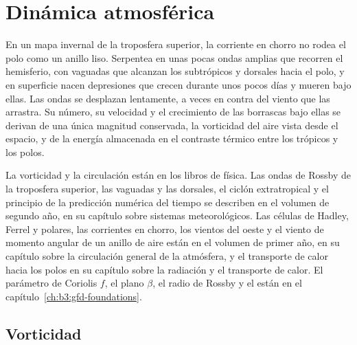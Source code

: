 \chapter{Dinámica atmosférica}\label{ch:b3:atmospheric-dynamics}

En un mapa invernal de la troposfera superior, la corriente en chorro no rodea
el polo como un anillo liso. Serpentea en unas pocas ondas amplias que recorren
el hemisferio, con vaguadas que alcanzan los subtrópicos y dorsales hacia el
polo, y en superficie nacen depresiones que crecen durante unos pocos días y
mueren bajo ellas. Las ondas se desplazan lentamente, a veces en contra del viento que las
arrastra. Su número, su velocidad y el crecimiento de las borrascas bajo ellas
se derivan de una única magnitud conservada, la vorticidad del aire vista desde
el espacio, y de la energía almacenada en el contraste térmico entre los
trópicos y los polos.

\begin{recall}
La vorticidad y la circulación están en los libros de física. Las ondas de Rossby de la
troposfera superior, las vaguadas y las dorsales, el ciclón extratropical y el
principio de la predicción numérica del tiempo se describen en el volumen de segundo
año, en su capítulo sobre sistemas meteorológicos. Las células de Hadley, Ferrel y
polares, las corrientes en chorro, los vientos del oeste y el viento de momento angular de un anillo de
aire están en el volumen de primer año, en su capítulo sobre la circulación general de
la atmósfera, y el transporte de calor hacia los polos en su capítulo sobre
la radiación y el transporte de calor. El parámetro de Coriolis $f$, el plano $\beta$,
el radio de Rossby y el  están en
el capítulo~\ref{ch:b3:gfd-foundations}.
\end{recall}

\section{Vorticidad}\label{sec:b3:atmospheric-dynamics:vorticity}

